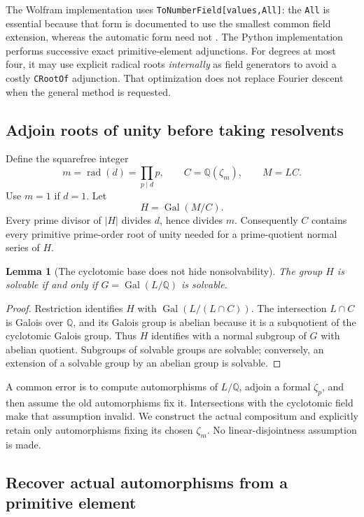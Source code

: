\documentclass[11pt,letterpaper]{article}
\newcommand{\Q}{\mathbb Q}\newcommand{\C}{\mathbb C}
\newcommand{\Gal}{\operatorname{Gal}}\newcommand{\rad}{\operatorname{rad}}
\newcommand{\code}[1]{\texttt{#1}}
\newtheorem{lemma}[theorem]{Lemma}
\theoremstyle{definition}\newtheorem{definition}[theorem]{Definition}
\theoremstyle{remark}\newtheorem{remark}[theorem]{Remark}
\begin{document}
The Wolfram implementation uses \code{ToNumberField[values,All]}: the
\code{All} is essential because that form is documented to use the smallest
common field extension, whereas the automatic form need not
\cite{tonumberfield}. The Python implementation performs successive exact
primitive-element adjunctions. For degrees at most four, it may use explicit
radical roots \emph{internally} as field generators to avoid a costly
\code{CRootOf} adjunction. That optimization does not replace Fourier descent
when the general method is requested.

\subsection{Adjoin roots of unity before taking resolvents}

Define the squarefree integer
\begin{equation}
        m=\rad(d)=\prod_{p\mid d}p,
        \qquad C=\Q(\zeta_m),\qquad M=LC.                    \label{eq:compositum}
\end{equation}
Use \(m=1\) if \(d=1\). Let
\[
                  H=\Gal(M/C).
\]
Every prime divisor of \(|H|\) divides \(d\), hence divides \(m\). Consequently
\(C\) contains every primitive prime-order root of unity needed for a
prime-quotient normal series of \(H\).

\begin{lemma}[The cyclotomic base does not hide nonsolvability]
The group \(H\) is solvable if and only if \(G=\Gal(L/\Q)\) is solvable.
\end{lemma}
\begin{proof}
Restriction identifies \(H\) with
\(\Gal(L/(L\cap C))\). The intersection \(L\cap C\) is Galois over \(\Q\),
and its Galois group is abelian because it is a subquotient of the
cyclotomic Galois group. Thus \(H\) identifies with a normal subgroup of
\(G\) with abelian quotient. Subgroups of solvable groups are solvable;
conversely, an extension of a solvable group by an abelian group is solvable.
\end{proof}

A common error is to compute automorphisms of \(L/\Q\), adjoin a formal
\(\zeta_p\), and then assume the old automorphisms fix it. Intersections with
the cyclotomic field make that assumption invalid. We construct the actual
compositum and explicitly retain only automorphisms fixing its chosen
\(\zeta_m\). No linear-disjointness assumption is made.

\subsection{Recover actual automorphisms from a primitive element}
\end{document}
